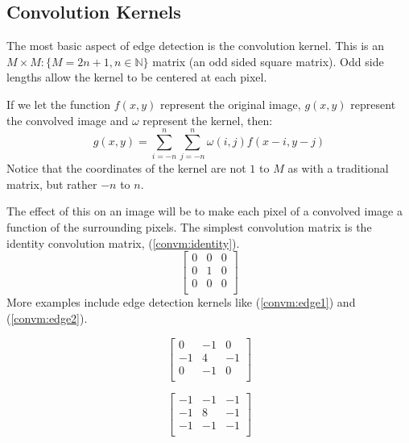 \documentclass[12pt,english]{article}
\begin{document}
\subsection{Convolution Kernels}
The most basic aspect of edge detection is the convolution kernel.
This is an $M{\times}M: \{M=2n+1, n\in\mathbb{N}\}$ matrix
(an odd sided square matrix).
Odd side lengths allow the kernel to be centered at each pixel.

If we let the function $f(x,y)$ represent the original image,
$g(x,y)$ represent the convolved image and $\omega$
represent the kernel, then:
\begin{equation}
	g(x,y)=\sum_{i=-n}^{n}\sum_{j=-n}^{n}\omega(i,j)f(x-i,y-j)
\end{equation}
Notice that the coordinates of the kernel are not $1$ to $M$
as with a traditional matrix, but rather $-n$ to $n$.

The effect of this on an image will be to make each pixel of a
convolved image a function of the surrounding pixels.
The simplest convolution matrix is the identity convolution matrix,
(\ref{convm:identity}).
\begin{equation}
	\label{convm:identity}
	\begin{bmatrix}
		0 & 0 & 0\\
		0 & 1 & 0\\
		0 & 0 & 0\\
	\end{bmatrix}
\end{equation}
More examples include edge detection kernels like
(\ref{convm:edge1}) and (\ref{convm:edge2}).
\begin{center}
\begin{minipage}{.4\linewidth}
\begin{equation} \label{convm:edge1}
	\begin{bmatrix}
		 0 & -1 &  0\\
		-1 &  4 & -1\\
		 0 & -1 &  0\\
	\end{bmatrix}
\end{equation}
\end{minipage}
\begin{minipage}{.4\linewidth}
\begin{equation} \label{convm:edge2}
	\begin{bmatrix}
		-1 & -1 & -1\\
		-1 &  8 & -1\\
		-1 & -1 & -1\\
	\end{bmatrix}
\end{equation}
\end{minipage}
\end{center}
\end{document}
